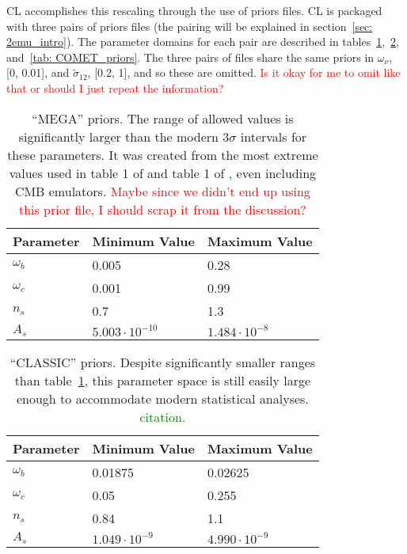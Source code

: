 
CL accomplishes this rescaling through the use of priors files.
CL is packaged with three pairs of priors files (the pairing will be explained
in section~\ref{sec: 2emu_intro}). The parameter domains for each pair are
described in tables~\ref{tab: MEGA_priors},~\ref{tab: CLASSIC_priors},
and~\ref{tab: COMET_priors}. The three pairs of files share the same priors in
$\omega_\nu$, [0, 0.01], and $\tilde{\sigma}_{12}$, [0.2, 1], and so these are
omitted. \textcolor{red}{Is it okay for me to omit like that or should I just
repeat the information?}

\begin{table}[ht!]
\centering
\begin{tabular}{l|l|l}
\hline
Parameter & Minimum Value & Maximum Value \\ \hline
$\omega_b$ & 0.005 & 0.28 \\
$\omega_c$ & 0.001 & 0.99 \\
$n_s$ & 0.7 & 1.3 \\
$A_s$\footnotemark & $5.003 \cdot 10^{-10}$ & $1.484 \cdot 10^{-8}$  \\
\end{tabular}
 \cprotect\caption[``MEGA'' priors]{``MEGA'' priors. The range of allowed
 	values is significantly larger than the modern $3\sigma$ intervals
 	for these parameters. It was created from the most extreme values used
 	in table 1 of \citet{Mancini} and table 1 of \citet{Arico}, even including
 	CMB emulators. 
 	\textcolor{red}{Maybe since we didn't end up using this prior file, I
 	should scrap it from the discussion?}}
 \label{tab: MEGA_priors}
\end{table}

\begin{table}[ht!]
\centering
\begin{tabular}{l|l|l}
\hline
Parameter & Minimum Value & Maximum Value \\ \hline
$\omega_b$ & 0.01875 & 0.02625 \\
$\omega_c$ & 0.05 & 0.255 \\
$n_s$ & 0.84 & 1.1 \\
$A_s$\footnotemark & $1.049 \cdot 10^{-9}$ & $4.990 \cdot 10^{-9}$  \\
\end{tabular}
	\cprotect\caption[``CLASSIC'' priors]{``CLASSIC'' priors. Despite
 	significantly smaller ranges than table~\ref{tab: MEGA_priors}, this
 	parameter space is still easily large enough to accommodate modern
 	statistical analyses. \textcolor{green}{citation.}}
 \label{tab: CLASSIC_priors}
\end{table}

